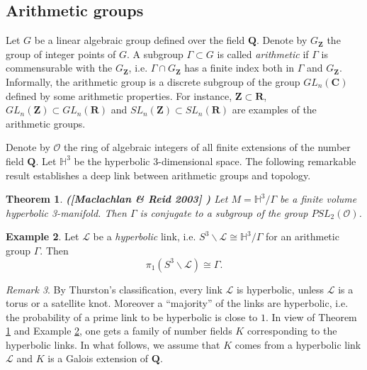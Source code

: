 \documentclass[10pt, reqno]{amsart}
\newtheorem{theorem}{Theorem}[section]
\theoremstyle{definition}
\newtheorem{example}[theorem]{Example}
\theoremstyle{remark}
\newtheorem{remark}[theorem]{Remark}
\numberwithin{equation}{section}
\begin{document}
\subsection{Arithmetic groups}
Let $G$ be a linear algebraic group defined over the field $\mathbf{Q}$.
Denote by $G_{\mathbf{Z}}$ the group of integer points of $G$. A subgroup 
$\Gamma\subset G$ is called {\it arithmetic} if $\Gamma$ is commensurable with 
the  $G_{\mathbf{Z}}$, i.e. $\Gamma\cap G_{\mathbf{Z}}$ has a finite index both
in $\Gamma$ and $G_{\mathbf{Z}}$. Informally, the arithmetic group is a discrete 
subgroup of the group $GL_n(\mathbf{C})$ defined by some arithmetic properties.
For instance, $\mathbf{Z}\subset\mathbf{R}$, $GL_n(\mathbf{Z})\subset GL_n(\mathbf{R})$ and
$SL_n(\mathbf{Z})\subset SL_n(\mathbf{R})$ are  examples of the arithmetic groups. 


Denote by $\mathcal{O}$ the ring of algebraic integers of all finite  
extensions of the number field $\mathbf{Q}$. 
Let $\mathbb{H}^3$ be the hyperbolic 3-dimensional space.
The following remarkable result establishes 
a deep link between arithmetic groups and  topology.
\begin{theorem}\label{thm2.4}
{\bf ([Maclachlan \& Reid  2003] \cite[p. 169]{MR})}
Let $M=\mathbb{H}^3/\Gamma$ be a finite volume hyperbolic  3-manifold.
Then $\Gamma$ is conjugate to a subgroup of the group $PSL_2(\mathcal{O})$.  
\end{theorem}
\begin{example}\label{ex2.5}
Let $\mathscr{L}$ be a {\it hyperbolic} link, i.e.  $S^3\backslash\mathscr{L}\cong \mathbb{H}^3/\Gamma$
for an arithmetic group  $\Gamma$. Then 
\begin{equation}\label{eq2.5} 
\pi_1(S^3 \backslash\mathscr{L})\cong\Gamma.
\end{equation}
\end{example}
\begin{remark}\label{rmk2.6}
By Thurston's classification, every link $\mathscr{L}$ is hyperbolic,  unless $\mathscr{L}$ 
is a torus or a satellite knot. Moreover a ``majority'' of the links are hyperbolic, i.e. the probability
of a prime link to be hyperbolic is close to $1$.    In view of Theorem \ref{thm2.4} and Example \ref{ex2.5},
one gets a family of number fields $K$ corresponding to the hyperbolic links. In what follows, we assume
that $K$ comes from a hyperbolic link $\mathscr{L}$ and $K$ is a Galois extension of $\mathbf{Q}$.  
\end{remark}
\end{document}
